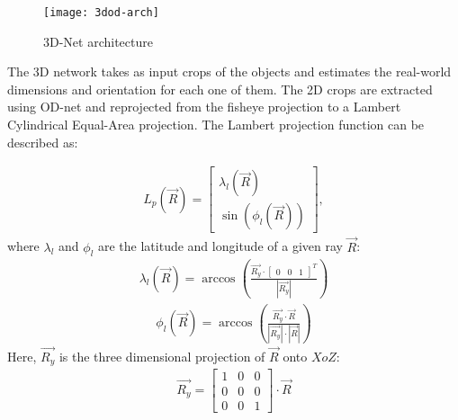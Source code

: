 \documentclass[10pt,twocolumn,letterpaper]{article}
\begin{document}
\begin{figure}[t]
\begin{center}
\texttt{[image: 3dod-arch]}
\end{center}
   \caption{3D-Net architecture}
\label{fig:3dod-arch}
\end{figure}
The 3D network takes as input crops of the objects and estimates the real-world dimensions and orientation for each one of them. The 2D crops are extracted using OD-net and reprojected from the fisheye projection to a Lambert Cylindrical Equal-Area projection\cite{lamb-eq}. The Lambert projection function can be described as:

\begin{equation}
\begin{aligned}
L_{p}(\vec{R}) = \left[ \begin{array}{c} \lambda_{l}(\vec{R}) \\ \sin(\phi_{l}(\vec{R})) \end{array}\right],
\end{aligned}
\end{equation}
where $ \lambda_{l} $ and $ \phi_{l} $ are the latitude and longitude of a given ray $ \vec{R} $: 
\begin{equation}
\begin{aligned}
\lambda_{l}(\vec{R}) = \arccos(\frac{\vec{R_{y}} \cdot \left[\begin{array}{ccc}0 & 0 & 1\end{array} \right]^{T}}{|\vec{R_{y}}|})
\end{aligned}
\end{equation}
\begin{equation}
\begin{aligned}
\phi_{l}(\vec{R}) = \arccos(\frac{\vec{R_{y}} \cdot \vec{R}}{|\vec{R_{y}}| \cdot |\vec{R}|})
\end{aligned}
\end{equation}
Here, $ \vec{R_{y}} $ is the three dimensional projection of $ \vec{R} $ onto $ XoZ $:
\begin{equation}
\begin{aligned}
\vec{R_{y}} = \left[ \begin{array}{ccc} 1 & 0 & 0 \\ 0 & 0 & 0 \\ 0 & 0 & 1 \end{array} \right] \cdot \vec{R}
\end{aligned}
\end{equation}
\end{document}
